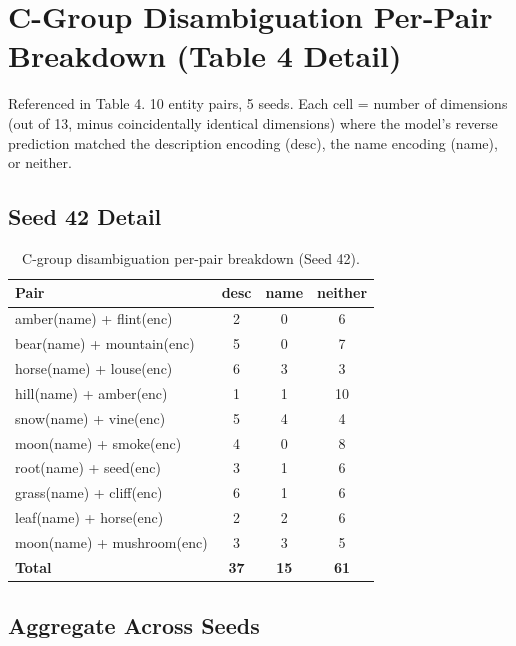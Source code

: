 \documentclass{article}
\begin{document}
\section{C-Group Disambiguation Per-Pair Breakdown (Table 4 Detail)}

Referenced in Table 4. 10 entity pairs, 5 seeds. Each cell = number of dimensions (out of 13, minus coincidentally identical dimensions) where the model's reverse prediction matched the description encoding (desc), the name encoding (name), or neither.

\subsection{Seed 42 Detail}

\begin{table}[htbp]
\centering
\small
\caption{C-group disambiguation per-pair breakdown (Seed 42).}
\label{tab:cgroup_seed42}
\begin{tabular}{lccc}
\toprule
Pair & desc & name & neither \\
\midrule
amber(name) + flint(enc) & 2 & 0 & 6 \\
bear(name) + mountain(enc) & 5 & 0 & 7 \\
horse(name) + louse(enc) & 6 & 3 & 3 \\
hill(name) + amber(enc) & 1 & 1 & 10 \\
snow(name) + vine(enc) & 5 & 4 & 4 \\
moon(name) + smoke(enc) & 4 & 0 & 8 \\
root(name) + seed(enc) & 3 & 1 & 6 \\
grass(name) + cliff(enc) & 6 & 1 & 6 \\
leaf(name) + horse(enc) & 2 & 2 & 6 \\
moon(name) + mushroom(enc) & 3 & 3 & 5 \\
\midrule
\textbf{Total} & \textbf{37} & \textbf{15} & \textbf{61} \\
\bottomrule
\end{tabular}
\end{table}

\subsection{Aggregate Across Seeds}
\end{document}
